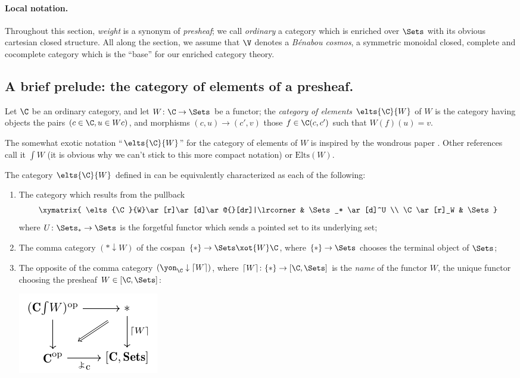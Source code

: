 \paragraph{\bf Local notation.} Throughout this section, \emph{weight} is a synonym of \emph{presheaf}; we call \emph{ordinary} a category which is enriched over $\Sets$ with its obvious cartesian closed structure. All along the section, we assume that $\V$ denotes a \emph{B\'enabou cosmos}, \ie a symmetric monoidal closed, complete and cocomplete category which is the ``base'' for our enriched category theory.
\subsection[The category of elements of a presheaf.]{A brief prelude: the category of elements of a presheaf.}
\begin{definition}\label{eltsf}
Let $\C$ be an ordinary category, and let $W\colon \C\to \Sets$ be a functor; the \emph{category of elements} $\elts{\C}{W}$ of $W$ is the category having objects the pairs $(c\in\C, u\in Wc)$, and morphisms $(c,u)\to (c',v)$ those $f\in \C(c,c')$ such that $W(f)(u)=v$.
\end{definition}
\begin{notat}
The somewhat exotic notation ``$\elts{\C}{W}$'' for the category of elements of $W$ is inspired by the wondrous paper \cite{Graya}. Other references call it $\int W$ (it is obvious why we can't stick to this more compact notation) or $\text{Elts}(W)$.
\end{notat}
\begin{proposition}\label{eltsf:char}
The category $\elts{\C}{W}$ defined in  can be equivalently characterized as each of the following:
\begin{enumerate}[label=$\roman*$)]
\item The category which results from the pullback 
\[
\xymatrix{
  \elts{\C}{W}\ar[r]\ar[d]\ar@{}[dr]|\lrcorner & \Sets_* \ar[d]^U \\
  \C \ar[r]_W & \Sets
}
\]
where $U\colon \Sets_*\to\Sets$ is the forgetful functor which sends a pointed set to its underlying set;
\item The comma category $(*\downarrow W)$ of the cospan $\{*\}\to \Sets \xot{W} \C$, where $\{*\}\to \Sets$ chooses the terminal object of $\Sets$;
\item The opposite of the comma category $(\yon_{\C}\downarrow \lceil W\rceil)$, where $\lceil W\rceil\colon \{*\}\to [\C, \Sets]$ is the \emph{name} of the functor $W$, \ie the unique functor choosing the presheaf $W\in [\C, \Sets]$:
\begin{center}
\includegraphics[scale=1]{figures/fig5}
\end{center}
\end{enumerate}
\end{proposition}

